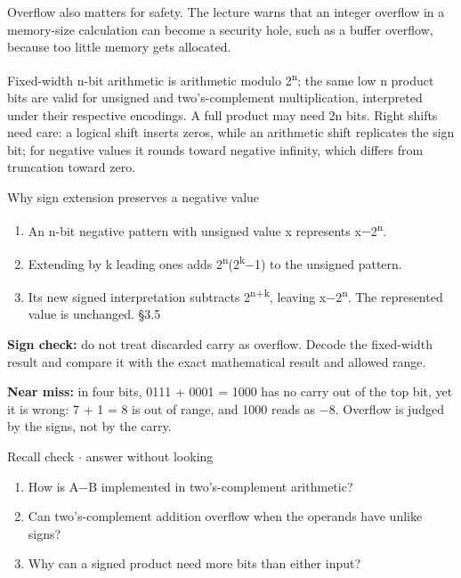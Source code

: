 \documentclass[11pt]{article}
\begin{document}
\begin{keepsection}
\begin{keepsection}
Overflow also matters for safety. The lecture warns that an integer overflow in a memory-size calculation can become a security hole, such as a buffer overflow, because too little memory gets allocated.

Fixed-width n-bit arithmetic is arithmetic modulo 2\textsuperscript{n}; the same low n product bits are valid for unsigned and two’s-complement multiplication, interpreted under their respective encodings. A full product may need 2n bits. Right shifts need care: a logical shift inserts zeros, while an arithmetic shift replicates the sign bit; for negative values it rounds toward negative infinity, which differs from truncation toward zero.

\begin{workedbox}{Why sign extension preserves a negative value}
\begin{enumerate}
\item An n-bit negative pattern with unsigned value x represents x\ensuremath{-}2\textsuperscript{n}.
\item Extending by k leading ones adds 2\textsuperscript{n}(2\textsuperscript{k}\ensuremath{-}1) to the unsigned pattern.
\item Its new signed interpretation subtracts 2\textsuperscript{n+k}, leaving x\ensuremath{-}2\textsuperscript{n}. The represented value is unchanged. \hfill{\small\color{FAUblue}§3.5}
\end{enumerate}
\end{workedbox}

\begin{notebox}\textbf{Sign check:} do not treat discarded carry as overflow. Decode the fixed-width result and compare it with the exact mathematical result and allowed range.\end{notebox}

\begin{notebox}\textbf{Near miss:} in four bits, 0111 + 0001 = 1000 has no carry out of the top bit, yet it is wrong: 7 + 1 = 8 is out of range, and 1000 reads as \ensuremath{-}8. Overflow is judged by the signs, not by the carry.\end{notebox}

\begin{recallbox}{Recall check \ensuremath{\cdot} answer without looking}
\begin{enumerate}
\item How is A\ensuremath{-}B implemented in two’s-complement arithmetic?
\item Can two’s-complement addition overflow when the operands have unlike signs?
\item Why can a signed product need more bits than either input?
\end{enumerate}


\end{recallbox}
\end{keepsection}
\end{keepsection}
\end{document}
